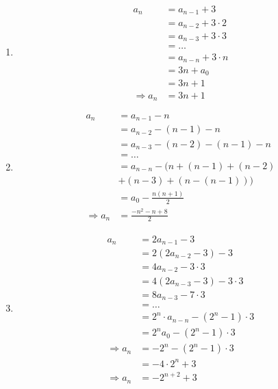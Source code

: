 \documentclass[12pt]{article}
\begin{document}
\begin{multicols}{2}
\begin{enumerate}[label=\alph*)]
          \item %
          \begin{align*}
            a_n &= a_{n-1} + 3 \\ 
            &= a_{n-2}+3\cdot 2 \\
            &= a_{n-3} + 3\cdot 3 \\
            &= \dots \\
            &= a_{n-n} + 3\cdot n \\
            &= 3n + a_0 \\
            &= 3n + 1 \\ 
            \Rightarrow a_n &= 3n + 1
          \end{align*}

          \item %
          \begin{align*}
            a_n &= a_{n-1} - n \\
            &= a_{n-2}-(n-1)-n \\
            &= a_{n-3}-(n-2)-(n-1)-n \\ 
            &= \dots \\
            &= a_{n-n}-(n+(n-1)+(n-2)\\&+(n-3)+(n-(n-1))) \\ 
            &= a_0-\frac{n(n+1)}{2} \\ 
            \Rightarrow a_ n &= \frac{-n^2-n+8}{2}
          \end{align*}
          \item %
          \begin{align*}
            a_n &= 2a_{n-1} - 3 \\
            &= 2(2a_{n-2} - 3) - 3 \\
            &= 4a_{n-2} - 3\cdot 3 \\
            &= 4(2a_{n-3} -3) - 3\cdot 3 \\
            &= 8a_{n-3} - 7\cdot 3 \\ 
            &= \dots \\
            &= 2^n\cdot a_{n-n} - (2^n-1)\cdot 3   \\
            &= 2^na_0 - (2^n-1)\cdot 3 \\
            \Rightarrow a_n &= -2^n - (2^n-1)\cdot 3 \\
            &= -4\cdot 2^n + 3 \\
            \Rightarrow a_n &= -2^{n+2} + 3
          \end{align*}


\end{enumerate}
\end{multicols}
\end{document}
